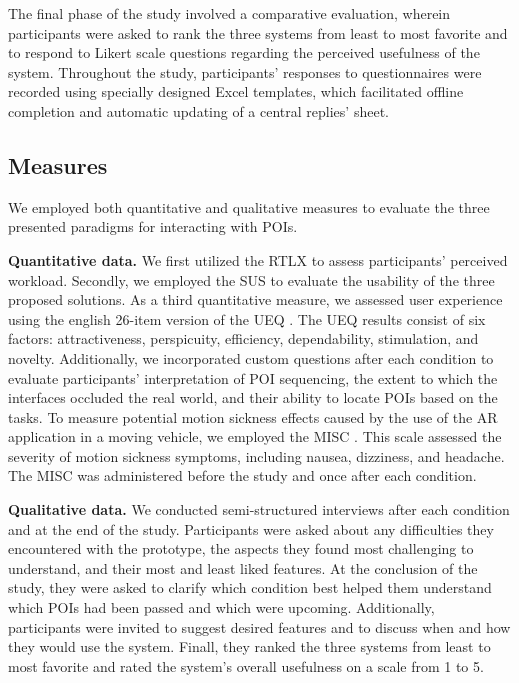 The final phase of the study involved a comparative evaluation, wherein participants were asked to rank the three systems from least to most favorite and to respond to Likert scale questions regarding the perceived usefulness of the system. Throughout the study, participants' responses to questionnaires were recorded using specially designed Excel templates, which facilitated offline completion and automatic updating of a central replies' sheet.



\subsection{Measures}
\label{sec:study_measures}
We employed both quantitative and qualitative measures to evaluate the three presented paradigms for interacting with POIs.

\textbf{Quantitative data.} We first utilized the RTLX \cite{hart1988development, hart2006nasa} to assess participants' perceived workload. Secondly, we employed the SUS \cite{Brooke96SUS} to evaluate the usability of the three proposed solutions. As a third quantitative measure, we assessed user experience using the english 26-item version of the UEQ \cite{Laugwitz2008UEQ}. The UEQ results consist of six factors: attractiveness, perspicuity, efficiency, dependability, stimulation, and novelty. Additionally, we incorporated custom questions after each condition to evaluate participants' interpretation of POI sequencing, the extent to which the interfaces occluded the real world, and their ability to locate POIs based on the tasks. To measure potential motion sickness effects caused by the use of the AR application in a moving vehicle, we employed the MISC \cite{Bos2006Misc}. This scale assessed the severity of motion sickness symptoms, including nausea, dizziness, and headache. The MISC was administered before the study and once after each condition.

\textbf{Qualitative data.} We conducted semi-structured interviews after each condition and at the end of the study. Participants were asked about any difficulties they encountered with the prototype, the aspects they found most challenging to understand, and their most and least liked features. At the conclusion of the study, they were asked to clarify which condition best helped them understand which POIs had been passed and which were upcoming. Additionally, participants were invited to suggest desired features and to discuss when and how they would use the system. Finall, they ranked the three systems from least to most favorite and rated the system's overall usefulness on a scale from 1 to 5.